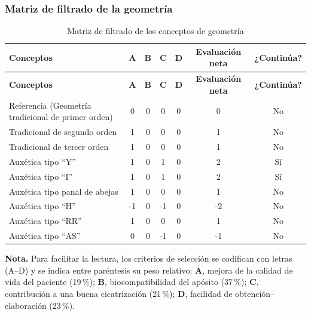 \documentclass[../../DocumentoCompleto.tex]{subfiles}
\begin{document}
 \subsubsection{Matriz de filtrado de la geometría}


\begin{longtable}{C{5.2cm}cccccc}
\caption{Matriz de filtrado de los conceptos de geometría}\\
\toprule
\textbf{Conceptos} &
\textbf{A} & \textbf{B} & \textbf{C} & \textbf{D} &
\textbf{Evaluación neta} & \textbf{¿Continúa?} \\
\midrule
\endfirsthead

\toprule
\textbf{Conceptos} &
\textbf{A} & \textbf{B} & \textbf{C} & \textbf{D} &
\textbf{Evaluación neta} & \textbf{¿Continúa?} \\
\midrule
\endhead

Referencia (Geometría tradicional de primer orden) & 0  & 0  & 0  & 0  & 0  & No \\
Tradicional de segundo orden                       & 1  & 0  & 0  & 0  & 1  & No \\
Tradicional de tercer orden                         & 1  & 0  & 0  & 0  & 1  & No \\
Auxética tipo ``Y''                                 & 1  & 0  & 1  & 0  & 2  & Sí \\
Auxética tipo ``I''                                 & 1  & 0  & 1  & 0  & 2  & Sí \\
Auxética tipo panal de abejas                       & 1  & 0  & 0  & 0  & 1  & No \\
Auxética tipo ``H''                                 & -1 & 0  & -1 & 0  & -2 & No \\
Auxética tipo ``RR''                                & 1  & 0  & 0  & 0  & 1  & No \\
Auxética tipo ``AS''                                & 0  & 0  & -1 & 0  & -1 & No \\
\bottomrule
\end{longtable}

\vspace{-0.4em}
\begin{center}
\begin{minipage}{0.95\textwidth}
\centering
\textbf{Nota.} Para facilitar la lectura, los criterios de selección se codifican con letras (A–D) y se indica entre paréntesis su peso relativo: \textbf{A}, mejora de la calidad de vida del paciente (19\,\%); \textbf{B}, biocompatibilidad del apósito (37\,\%); \textbf{C}, contribución a una buena cicatrización (21\,\%); \textbf{D}, facilidad de obtención–elaboración (23\,\%).

\end{minipage}
\end{center}
\end{document}
